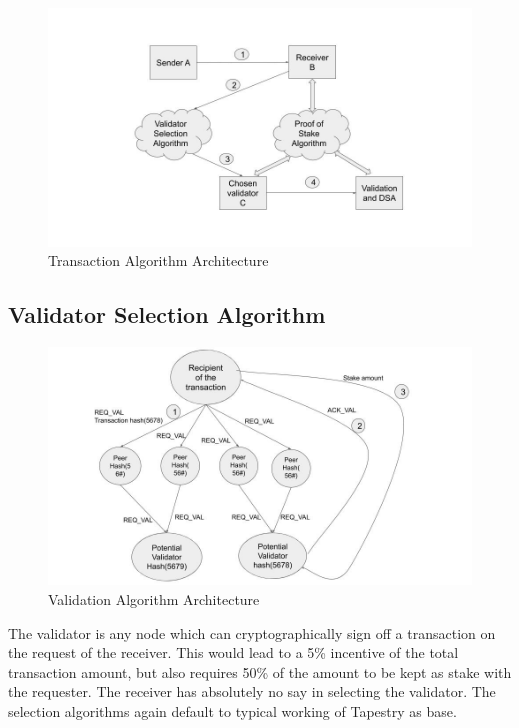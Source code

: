 \documentclass[conference,a4paper,12pt]{IEEEtran}
\begin{document}
	\begin{figure}[h]
	  \includegraphics[width=\linewidth]{transaction_algo.jpg}
	  \caption{Transaction Algorithm Architecture}
	  \label{Transaction Architecture}
	\end{figure}

	\subsection{Validator Selection Algorithm}

	\begin{figure}[h]
	  \includegraphics[width=\linewidth]{validation_algo.jpg}
	  \caption{Validation Algorithm Architecture}
	  \label{Validation Architecture}
	\end{figure}


	The validator is any node which can cryptographically sign off a transaction on the request of the receiver. This would lead to a 5\% incentive of the total transaction amount, but also requires 50\% of the amount to be kept as stake with the requester. The receiver has absolutely no say in selecting the validator. The selection algorithms again default to typical working of Tapestry \cite{tapestry_infra} as base.
\end{document}
